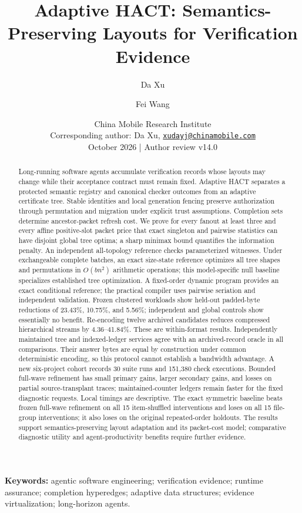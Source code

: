 \documentclass[11pt]{article}
\title{\vspace{-9mm}\textbf{Adaptive HACT: Semantics-Preserving Layouts for Verification Evidence}}
\author{Da Xu \and Fei Wang}
\date{\small China Mobile Research Institute\\
Corresponding author: Da Xu, \href{mailto:xudayj@chinamobile.com}{\texttt{xudayj@chinamobile.com}}\\[3pt]
October 2026 \quad | \quad Author review v14.0}
\theoremstyle{definition}\newtheorem{definition}[theorem]{Definition}
\begin{document}
\maketitle
\begin{abstract}
Long-running software agents accumulate verification records whose layouts
may change while their acceptance contract must remain fixed. Adaptive HACT
separates a protected semantic registry and canonical checker outcomes from
an adaptive certificate tree. Stable identities and local generation fencing
preserve authorization through permutation and migration under explicit
trust assumptions. Completion sets determine ancestor-packet refresh cost.
We prove for every fanout at least three and every affine positive-slot
packet price that exact singleton and pairwise statistics can have disjoint
global tree optima; a sharp minimax bound quantifies the information penalty.
An independent all-topology reference checks parameterized witnesses. Under
exchangeable complete batches, an exact size-state reference optimizes all
tree shapes and permutations in $O(bn^2)$ arithmetic operations; this
model-specific null baseline specializes established tree optimization.
A fixed-order
dynamic program provides an exact conditional reference; the practical
compiler uses pairwise seriation and independent validation. Frozen clustered
workloads show held-out padded-byte reductions of 23.43\%, 10.75\%, and 5.56\%;
independent and global controls show essentially no benefit. Re-encoding
twelve archived candidates reduces compressed hierarchical streams by
4.36--41.84\%. These are within-format results. Independently maintained tree
and indexed-ledger services agree with an archived-record oracle in all
\VnineOracleMatches{} comparisons. Their answer bytes are equal by construction
under common deterministic encoding, so this protocol cannot establish a
bandwidth advantage. A new six-project cohort records 30 suite runs and 151,380 check executions.
Bounded full-wave refinement has small primary gains, larger secondary gains,
and losses on partial source-transplant traces; maintained-counter ledgers
remain faster for the fixed diagnostic requests. Local timings are descriptive.
The exact symmetric baseline beats frozen full-wave refinement on all 15
item-shuffled interventions and loses on all 15 file-group interventions;
it also loses on the original repeated-order holdouts. The results support
semantics-preserving layout adaptation and its packet-cost model; comparative
diagnostic utility and agent-productivity benefits require further evidence.
\end{abstract}
\noindent\textbf{Keywords:} agentic software engineering; verification evidence; runtime assurance; completion hyperedges; adaptive data structures; evidence virtualization; long-horizon agents.
\end{document}
